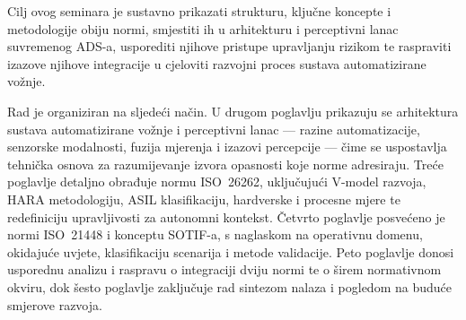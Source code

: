Cilj ovog seminara je sustavno prikazati strukturu, ključne koncepte i metodologije obiju normi, smjestiti ih u arhitekturu i perceptivni lanac suvremenog ADS-a, usporediti njihove pristupe upravljanju rizikom te raspraviti izazove njihove integracije u cjeloviti razvojni proces sustava automatizirane vožnje.

Rad je organiziran na sljedeći način. U drugom poglavlju prikazuju se arhitektura sustava automatizirane vožnje i perceptivni lanac — razine automatizacije, senzorske modalnosti, fuzija mjerenja i izazovi percepcije — čime se uspostavlja tehnička osnova za razumijevanje izvora opasnosti koje norme adresiraju. Treće poglavlje detaljno obrađuje normu ISO~26262, uključujući V-model razvoja, HARA metodologiju, ASIL klasifikaciju, hardverske i procesne mjere te redefiniciju upravljivosti za autonomni kontekst. Četvrto poglavlje posvećeno je normi ISO~21448 i konceptu SOTIF-a, s naglaskom na operativnu domenu, okidajuće uvjete, klasifikaciju scenarija i metode validacije. Peto poglavlje donosi usporednu analizu i raspravu o integraciji dviju normi te o širem normativnom okviru, dok šesto poglavlje zaključuje rad sintezom nalaza i pogledom na buduće smjerove razvoja.
